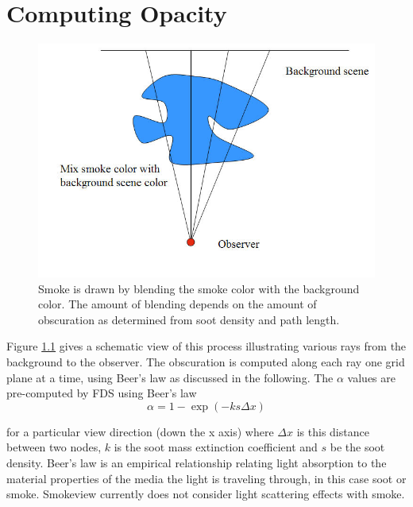 \documentclass[11pt,twoside]{book}
\begin{document}

\chapter{Computing Opacity}
\begin{figure}[t]
\begin{center}
\includegraphics[width=6.0in]{figures/smoke_setup}
\end{center}
\caption {Smoke is drawn by blending the smoke color with the
background color.  The amount of blending depends on the amount of
obscuration as determined from soot density and path length.}
\label{figsmokesetup}
\end{figure}

Figure \ref{figsmokesetup} gives a schematic view of this process illustrating various rays from the background to the observer.  The obscuration is computed along each ray one grid plane at a time, using Beer's law as discussed in the following.  The $\alpha$ values are pre-computed by FDS using Beer's
law\cite{Siegel:2001}
\begin{equation}
\alpha=1-\exp(-ks\Delta x) \label{eq:alpha}
\end{equation}

\noindent for a particular view direction (down the x axis) where $\Delta x$
is this distance between two nodes, $k$ is the soot mass
extinction coefficient and $s$ be the soot density. Beer's law is
an empirical relationship relating light absorption to the
material properties of the media the light is traveling through,
in this case soot or smoke.  Smokeview currently does not consider
light scattering effects with smoke.
\end{document}
